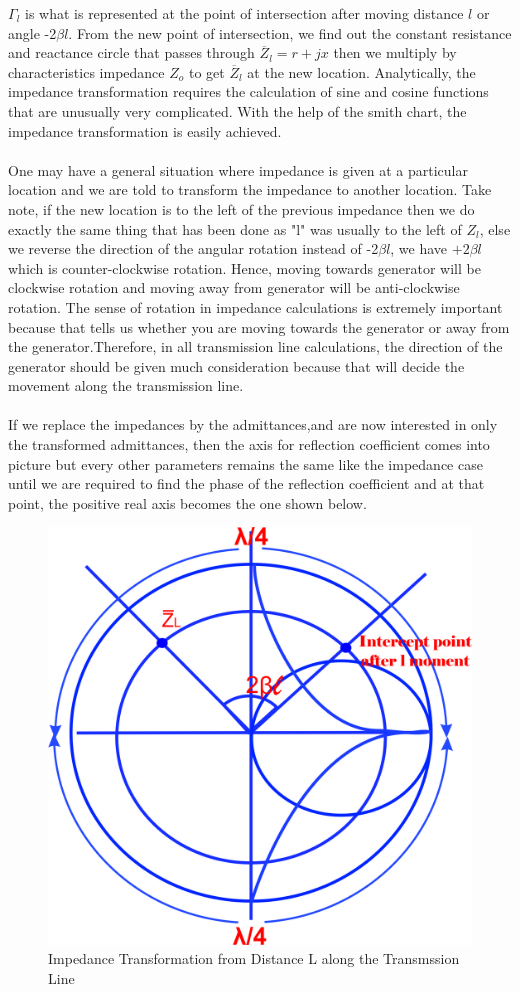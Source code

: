 $\Gamma_{l}$ is what is represented at the point of intersection after moving distance $l$ or angle -2$\beta{l}$. From the new point of  intersection, we find out the constant resistance and reactance circle that passes through $\overline{Z}_{l} = r + jx$ then we multiply by characteristics impedance $Z_o$ to get $\overline{Z}_{l}$ at the new location. Analytically, the impedance transformation requires the calculation of sine and cosine functions that are unusually very complicated. With the help of the smith chart, the impedance transformation is easily achieved.\\\\
One may have a general situation where impedance is given at a particular location and we are told to transform the impedance to another location. Take note, if the new location is to the left of the previous impedance then we do exactly the same thing that has been done as "l" was usually to the left of $Z_{l}$, else we reverse the direction of the angular rotation instead of -2$\beta{l}$, we have $+2\beta{l}$ which is counter-clockwise rotation. Hence, moving towards generator will be clockwise rotation and moving away from generator will be anti-clockwise rotation. The sense of rotation in impedance calculations is extremely important because that tells us whether you are moving towards the generator or away from the generator.Therefore, in all transmission line calculations, the direction of the generator should be given much consideration because that will decide the movement along the transmission line. \\\\
If we replace the impedances by the admittances,and are now interested in only the transformed admittances, then the axis for reflection coefficient comes into picture but every other parameters remains the same like the impedance case until we are required to find the phase of the reflection coefficient and at that point, the positive real axis becomes the one shown below.
\begin{figure}[h]
\centering
\includegraphics[width=0.5\linewidth]{./graphics/mjhtre}
\caption{Impedance Transformation from Distance L along the Transmssion Line}
\label{fig:mjhtre}
\end{figure}

